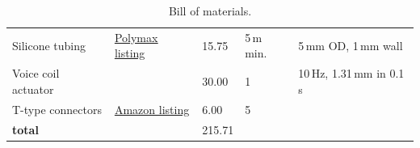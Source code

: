 \documentclass[10pt, a4paper]{article}
\begin{document}
\begin{table}[H]
\begin{tabularx}{\linewidth}{>{\raggedright\arraybackslash}X l l l l}
        Silicone tubing
                       & \href{https://www.polymax.co.uk/silicone/silicone-tubing}{\uline{Polymax listing}}
                       & 15.75                                                                                                                                                                 & 5\,m min.         & 5\,mm OD, 1\,mm wall                  \\

        Voice coil actuator
                       &
                       & 30.00
                       & 1
                       & 10\,Hz, 1.31\,mm in 0.1\,s                                                                                                                                                                                                        \\
        T-type connectors
                       & \href{https://www.amazon.co.uk/TopHomer-Connector-Corrugated-Irrigation-Connectors/dp/B0CQCXNFT2}{\uline{Amazon listing}}
                       & 6.00
                       & 5
                       &                                                                                                                                                                                                                                   \\
        \midrule
        \textbf{total} &                                                                                                                                                                       & 215.71            &                                       \\
        \bottomrule
    \end{tabularx}
    \caption{Bill of materials.}
\end{table}
\end{document}
